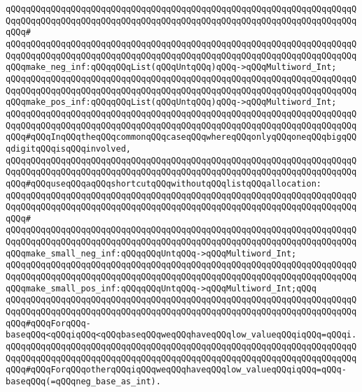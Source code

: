 \verb|qQQqqQQqqQQqqQQqqQQqqQQqqQQqqQQqqQQqqQQqqQQqqQQqqQQqqQQqqQQqqQQqqQQqqQQqqQQqqQQqqQQqqQQqqQQqqQQqqQQqqQQqqQQqqQQqqQQqqQQqqQQqqQQqqQQqqQQqqQQqqQQq#|\newline
\verb|qQQqqQQqqQQqqQQqqQQqqQQqqQQqqQQqqQQqqQQqqQQqqQQqqQQqqQQqqQQqqQQqqQQqqQQqqQQqqQQqqQQqqQQqqQQqqQQqqQQqqQQqqQQqqQQqqQQqqQQqqQQqqQQqqQQqqQQqqQQqqQQqmake_neg_inf:qQQqqQQqList(qQQqUntqQQq)qQQq->qQQqMultiword_Int;|\newline
\verb|qQQqqQQqqQQqqQQqqQQqqQQqqQQqqQQqqQQqqQQqqQQqqQQqqQQqqQQqqQQqqQQqqQQqqQQqqQQqqQQqqQQqqQQqqQQqqQQqqQQqqQQqqQQqqQQqqQQqqQQqqQQqqQQqqQQqqQQqqQQqqQQqmake_pos_inf:qQQqqQQqList(qQQqUntqQQq)qQQq->qQQqMultiword_Int;|\newline
\newline
\verb|qQQqqQQqqQQqqQQqqQQqqQQqqQQqqQQqqQQqqQQqqQQqqQQqqQQqqQQqqQQqqQQqqQQqqQQqqQQqqQQqqQQqqQQqqQQqqQQqqQQqqQQqqQQqqQQqqQQqqQQqqQQqqQQqqQQqqQQqqQQqqQQq#qQQqInqQQqtheqQQqcommonqQQqcaseqQQqwhereqQQqonlyqQQqoneqQQqbigqQQqdigitqQQqisqQQqinvolved,|\newline
\verb|qQQqqQQqqQQqqQQqqQQqqQQqqQQqqQQqqQQqqQQqqQQqqQQqqQQqqQQqqQQqqQQqqQQqqQQqqQQqqQQqqQQqqQQqqQQqqQQqqQQqqQQqqQQqqQQqqQQqqQQqqQQqqQQqqQQqqQQqqQQqqQQq#qQQquseqQQqaqQQqshortcutqQQqwithoutqQQqlistqQQqallocation:|\newline
\verb|qQQqqQQqqQQqqQQqqQQqqQQqqQQqqQQqqQQqqQQqqQQqqQQqqQQqqQQqqQQqqQQqqQQqqQQqqQQqqQQqqQQqqQQqqQQqqQQqqQQqqQQqqQQqqQQqqQQqqQQqqQQqqQQqqQQqqQQqqQQqqQQq#|\newline
\verb|qQQqqQQqqQQqqQQqqQQqqQQqqQQqqQQqqQQqqQQqqQQqqQQqqQQqqQQqqQQqqQQqqQQqqQQqqQQqqQQqqQQqqQQqqQQqqQQqqQQqqQQqqQQqqQQqqQQqqQQqqQQqqQQqqQQqqQQqqQQqqQQqmake_small_neg_inf:qQQqqQQqUntqQQq->qQQqMultiword_Int;|\newline
\verb|qQQqqQQqqQQqqQQqqQQqqQQqqQQqqQQqqQQqqQQqqQQqqQQqqQQqqQQqqQQqqQQqqQQqqQQqqQQqqQQqqQQqqQQqqQQqqQQqqQQqqQQqqQQqqQQqqQQqqQQqqQQqqQQqqQQqqQQqqQQqqQQqmake_small_pos_inf:qQQqqQQqUntqQQq->qQQqMultiword_Int;qQQq|\newline
\newline
\verb|qQQqqQQqqQQqqQQqqQQqqQQqqQQqqQQqqQQqqQQqqQQqqQQqqQQqqQQqqQQqqQQqqQQqqQQqqQQqqQQqqQQqqQQqqQQqqQQqqQQqqQQqqQQqqQQqqQQqqQQqqQQqqQQqqQQqqQQqqQQqqQQq#qQQqForqQQq-baseqQQq<qQQqiqQQq<qQQqbaseqQQqweqQQqhaveqQQqlow_valueqQQqiqQQq=qQQqi.|\newline
\verb|qQQqqQQqqQQqqQQqqQQqqQQqqQQqqQQqqQQqqQQqqQQqqQQqqQQqqQQqqQQqqQQqqQQqqQQqqQQqqQQqqQQqqQQqqQQqqQQqqQQqqQQqqQQqqQQqqQQqqQQqqQQqqQQqqQQqqQQqqQQqqQQq#qQQqForqQQqotherqQQqiqQQqweqQQqhaveqQQqlow_valueqQQqiqQQq=qQQq-baseqQQq(=qQQqneg_base_as_int).|\newline

